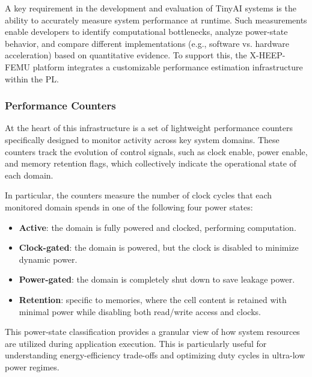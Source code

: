             A key requirement in the development and evaluation of TinyAI systems is the ability to accurately measure system performance at runtime. Such measurements enable developers to identify computational bottlenecks, analyze power-state behavior, and compare different implementations (e.g., software vs. hardware acceleration) based on quantitative evidence. To support this, the \mbox{X-HEEP-FEMU} platform integrates a customizable performance estimation infrastructure within the PL.

            \subsubsection*{Performance Counters}
            
                At the heart of this infrastructure is a set of lightweight performance counters specifically designed to monitor activity across key system domains. These counters track the evolution of control signals, such as clock enable, power enable, and memory retention flags, which collectively indicate the operational state of each domain. 
                
                In particular, the counters measure the number of clock cycles that each monitored domain spends in one of the following four power states:

                \vspace{-1em}
                \begin{itemize}
                    \item \textbf{Active}: the domain is fully powered and clocked, performing computation.
                    \item \textbf{Clock-gated}: the domain is powered, but the clock is disabled to minimize dynamic power.
                    \item \textbf{Power-gated}: the domain is completely shut down to save leakage power.
                    \item \textbf{Retention}: specific to memories, where the cell content is retained with minimal power while disabling both read/write access and clocks.
                \end{itemize}
                \vspace{-1em}

                This power-state classification provides a granular view of how system resources are utilized during application execution. This is particularly useful for understanding energy-efficiency trade-offs and optimizing duty cycles in ultra-low power regimes.
                
